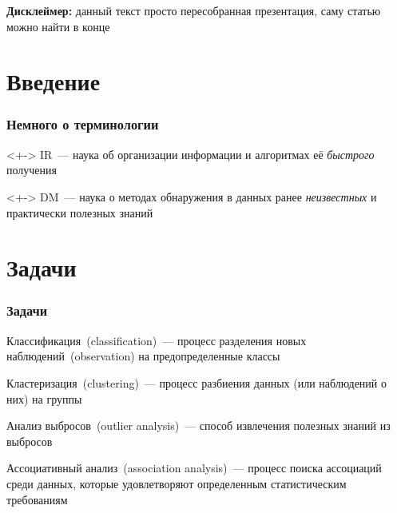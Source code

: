 \textbf{Дисклеймер:} данный текст просто пересобранная презентация, саму статью можно найти в конце

\section{Введение}

\begin{frame}
    \frametitle{Немного о терминологии}


    \begin{definition}<+->
        IR~--- наука об организации информации и алгоритмах её \textit{быстрого} получения
    \end{definition}

    \begin{definition}<+->
        DM~--- наука о методах обнаружения в данных ранее \textit{неизвестных} и практически полезных знаний
    \end{definition}


\end{frame}

\section{Задачи}

\begin{frame}[allowframebreaks]
    \frametitle{Задачи}
    \begin{definition}
        Классификация~(classification)~--- процесс разделения новых наблюдений~(observation) на предопределенные классы
    \end{definition}

    \begin{definition}
        Кластеризация~(clustering)~--- процесс разбиения данных (или наблюдений о них) на группы
    \end{definition}


    \begin{definition}
        Анализ выбросов~(outlier analysis)~--- способ извлечения полезных знаний из выбросов
    \end{definition}

    \begin{definition}
        Ассоциативный анализ~(association analysis)~--- процесс поиска ассоциаций среди данных, которые удовлетворяют определенным статистическим требованиям
    \end{definition}

\end{frame}

